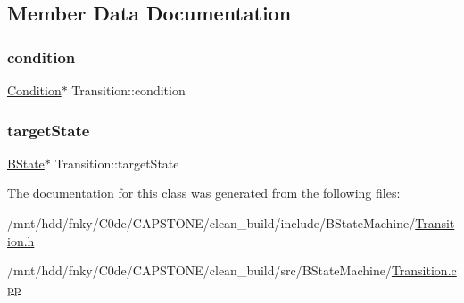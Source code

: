 \subsection{Member Data Documentation}
\mbox{\label{classTransition_a58c79ffaf550ab045550fb4064da5317}} 
\subsubsection{\texorpdfstring{condition}{condition}}
{\footnotesize\ttfamily \hyperlink{classCondition}{Condition}$\ast$ Transition\+::condition\hspace{0.3cm}{\ttfamily [private]}}

\mbox{\label{classTransition_a076da5d4696dc601774c5f8967b591e7}} 
\subsubsection{\texorpdfstring{target\+State}{targetState}}
{\footnotesize\ttfamily \hyperlink{classBState}{B\+State}$\ast$ Transition\+::target\+State\hspace{0.3cm}{\ttfamily [private]}}



The documentation for this class was generated from the following files\+:\begin{DoxyCompactItemize}
\item 
/mnt/hdd/fnky/\+C0de/\+C\+A\+P\+S\+T\+O\+N\+E/clean\+\_\+build/include/\+B\+State\+Machine/\hyperlink{Transition_8h}{Transition.\+h}\item 
/mnt/hdd/fnky/\+C0de/\+C\+A\+P\+S\+T\+O\+N\+E/clean\+\_\+build/src/\+B\+State\+Machine/\hyperlink{Transition_8cpp}{Transition.\+cpp}\end{DoxyCompactItemize}
